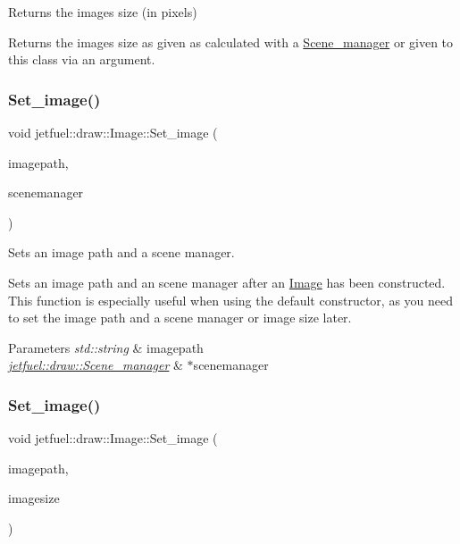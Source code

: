 Returns the image\textquotesingle{}s size (in pixels) 

Returns the image\textquotesingle{}s size as given as calculated with a \hyperlink{classjetfuel_1_1draw_1_1Scene__manager}{Scene\+\_\+manager} or given to this class via an argument. \mbox{\label{classjetfuel_1_1draw_1_1Image_a2259992a6ae87fdebfe088f07a7bcc4e}} 
\subsubsection{\texorpdfstring{Set\+\_\+image()}{Set\_image()}\hspace{0.1cm}{\footnotesize\ttfamily [1/2]}}
{\footnotesize\ttfamily void jetfuel\+::draw\+::\+Image\+::\+Set\+\_\+image (\begin{DoxyParamCaption}\item[{const std\+::string}]{imagepath,  }\item[{\hyperlink{classjetfuel_1_1draw_1_1Scene__manager}{Scene\+\_\+manager} $\ast$}]{scenemanager }\end{DoxyParamCaption})}



Sets an image path and a scene manager. 

Sets an image path and an scene manager after an \hyperlink{classjetfuel_1_1draw_1_1Image}{Image} has been constructed. This function is especially useful when using the default constructor, as you need to set the image path and a scene manager or image size later.


\begin{DoxyParams}{Parameters}
{\em std\+::string} & imagepath \\
\hline
{\em \hyperlink{classjetfuel_1_1draw_1_1Scene__manager}{jetfuel\+::draw\+::\+Scene\+\_\+manager}} & $\ast$scenemanager \\
\hline
\end{DoxyParams}
\mbox{\label{classjetfuel_1_1draw_1_1Image_a4b445f5105eaed28d9a18d6bf3ed44bb}} 
\subsubsection{\texorpdfstring{Set\+\_\+image()}{Set\_image()}\hspace{0.1cm}{\footnotesize\ttfamily [2/2]}}
{\footnotesize\ttfamily void jetfuel\+::draw\+::\+Image\+::\+Set\+\_\+image (\begin{DoxyParamCaption}\item[{const std\+::string}]{imagepath,  }\item[{const \hyperlink{classjetfuel_1_1draw_1_1Vector2d}{Vector2d\+\_\+int}}]{imagesize }\end{DoxyParamCaption})}



